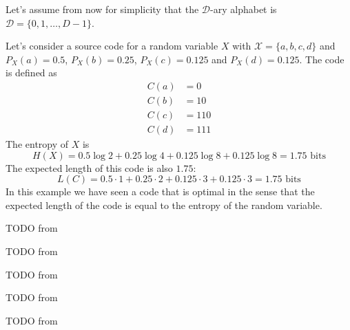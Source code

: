\noindent Let's assume from now for simplicity that the $\mathcal{D}$-ary alphabet is $\mathcal{D} = \{0, 1, \ldots, D-1\}$.

\begin{example}
    Let's consider a source code for a random variable $X$ with $\mathcal{X} = \{a, b, c, d\}$ and $P_X(a) = 0.5$, $P_X(b) = 0.25$, $P_X(c) = 0.125$ and $P_X(d) = 0.125$. The code is defined as
    \begin{align*}
        C(a) &= 0 \\
        C(b) &= 10 \\
        C(c) &= 110 \\
        C(d) &= 111
    \end{align*}
    The entropy of $X$ is
    \begin{equation*}
        H(X) = 0.5\log 2 + 0.25\log 4 + 0.125\log 8 + 0.125\log 8 = 1.75 \text{ bits}
    \end{equation*}
    The expected length of this code is also $1.75$:
    \begin{equation*}
        L(C) = 0.5 \cdot 1 + 0.25 \cdot 2 + 0.125 \cdot 3 + 0.125 \cdot 3 = 1.75 \text{ bits}
    \end{equation*}
    In this example we have seen a code that is optimal in the sense that the expected length of the code is equal to the entropy of the random variable.
\end{example}

\begin{example}\label{ex:morse_code}
    TODO from \cite{ElementsofInformationTheory}
\end{example}

\begin{definition}\label{def:nonsingular_code}
    TODO from \cite{ElementsofInformationTheory}
\end{definition}

\begin{definition}\label{def:extension_code}
    TODO from \cite{ElementsofInformationTheory}
\end{definition}

\begin{definition}\label{def:unique_decodability}
    TODO from \cite{ElementsofInformationTheory}
\end{definition}

\begin{definition}\label{def:prefix_code}
    TODO from \cite{ElementsofInformationTheory}
\end{definition}

